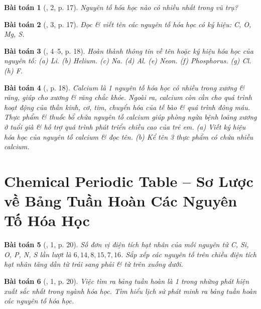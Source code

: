 \documentclass{article}
\newtheorem{baitoan}{Bài toán}
\begin{document}
\begin{baitoan}[\cite{SGK_KHTN_7_Canh_Dieu}, 2, p. 17]
	Nguyên tố hóa học nào có nhiều nhất trong vũ trụ?
\end{baitoan}

\begin{baitoan}[\cite{SGK_KHTN_7_Canh_Dieu}, 3, p. 17]
	Đọc \& viết tên các nguyên tố hóa học có ký hiệu: \emph{C, O, Mg, S}.
\end{baitoan}

\begin{baitoan}[\cite{SGK_KHTN_7_Canh_Dieu}, 4--5, p. 18]
	Hoàn thành thông tin về tên hoặc ký hiệu hóa học của nguyên tố: (a) \emph{Li}. (b) Helium. (c) \emph{Na}. (d) \emph{Al}. (e) Neon. (f) Phosphorus. (g) \emph{Cl}. (h) \emph{F}.
\end{baitoan}

\begin{baitoan}[\cite{SGK_KHTN_7_Canh_Dieu}, p. 18]
	Calcium là 1 nguyên tố hóa học có nhiều trong xương \& răng, giúp cho xương \& răng chắc khỏe. Ngoài ra, calcium còn cần cho quá trình hoạt động của thần kinh, cơ, tim, chuyển hóa của tế bào \& quá trình đông máu. Thực phẩm \& thuốc bổ chứa nguyên tố calcium giúp phòng ngừa bệnh loãng xương ở tuổi già \& hỗ trợ quá trình phát triển chiều cao của trẻ em. (a) Viết ký hiệu hóa học của nguyên tố calcium \& đọc tên. (b) Kể tên 3 thực phẩm có chứa nhiều calcium.
\end{baitoan}


\section{Chemical Periodic Table -- Sơ Lược về Bảng Tuần Hoàn Các Nguyên Tố Hóa Học}

\begin{baitoan}[\cite{SGK_KHTN_7_Canh_Dieu}, 1, p. 20]
	Số đơn vị điện tích hạt nhân của mỗi nguyên tử \emph{C, Si, O, P, N, S} lần lượt là $6,14,8,15,7,16$. Sắp xếp các nguyên tố trên chiều điện tích hạt nhân tăng dần từ trái sang phải \& từ trên xuống dưới.
\end{baitoan}

\begin{baitoan}[\cite{SGK_KHTN_7_Canh_Dieu}, 1, p. 20]
	Việc tìm ra bảng tuần hoàn là 1 trong những phát hiện xuất sắc nhất trong ngành hóa học. Tìm hiểu lịch sử phát minh ra bảng tuần hoàn các nguyên tố hóa học.
\end{baitoan}
\end{document}
